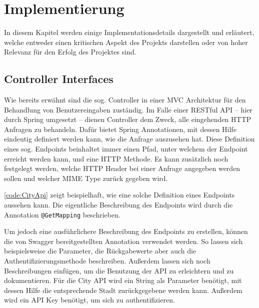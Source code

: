 \chapter{Implementierung}

	In diesem Kapitel werden einige Implementationsdetails dargestellt und erläutert, welche entweder einen kritischen Aspekt des Projekts darstellen oder von hoher Relevanz für den Erfolg des Projektes sind. 
	
	\section{Controller Interfaces}
	
		Wie bereits erwähnt sind die sog. Controller in einer \acs{MVC} Architektur für den Behandlung von Benutzereingaben zuständig. Im Falle einer \acs{REST}ful \acs{API} -- hier durch Spring umgesetzt -- dienen Controller dem Zweck, alle eingehenden \acs{HTTP} Anfragen zu behandeln. Dafür bietet Spring Annotationen, mit dessen Hilfe eindeutig definiert werden kann, wie die Anfrage auszusehen hat. Diese Definition eines sog. Endpoints beinhaltet immer einen Pfad, unter welchem der Endpoint erreicht werden kann, und eine \acs{HTTP} Methode. Es kann zusätzlich noch festgelegt werden, welche \acs{HTTP} Header bei einer Anfrage angegeben werden sollen und welcher \acs{MIME} Type zurück gegeben wird.
		
		\autoref{code:CityApi} zeigt beispielhaft, wie eine solche Definition eines Endpoints aussehen kann. Die eigentliche Beschreibung des Endpoints wird durch die Annotation \lstinline|@GetMapping| beschrieben. 	
		
		Um jedoch eine ausführlichere Beschreibung des Endpoints zu erstellen, können die von Swagger bereitgestellten Annotation verwendet werden. So lassen sich beispielsweise die Parameter, die Rückgabewerte aber auch die Authentifizierungsmethode beschreiben. Außerdem lassen sich noch Beschreibungen einfügen, um die Benutzung der \acs{API} zu erleichtern und zu dokumentieren. Für die City \acs{API} wird ein String als Parameter benötigt, mit dessen Hilfe die entsprechende Stadt zurückgegebene werden kann. Außerdem wird ein \acs{API} Key benötigt, um sich zu authentifizieren. 
		
		
		
